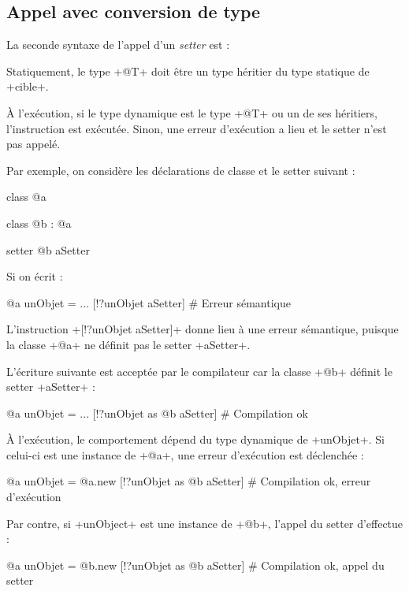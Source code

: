 \subsection{Appel avec conversion de type}

La seconde syntaxe de l'appel d'un  \emph{setter} est :

\begin{galgas}
\end{galgas}

Statiquement, le type \ggs+@T+ doit être un type héritier du type statique de \ggs+cible+.

À l'exécution, si le type dynamique est le type \ggs+@T+ ou un de ses héritiers, l'instruction est exécutée. Sinon, une erreur d'exécution a lieu et le setter n'est pas appelé.

Par exemple, on considère les déclarations de classe et le setter suivant :

\begin{galgas}
class @a { }

class @b : @a { }

setter @b aSetter { }
\end{galgas}

Si on écrit :
\begin{galgas}
@a unObjet = ...
[!?unObjet aSetter] # Erreur sémantique
\end{galgas}

L'instruction \ggs+[!?unObjet aSetter]+ donne lieu à une erreur sémantique, puisque la classe \ggs+@a+ ne définit pas le setter \ggs+aSetter+.

L'écriture suivante est acceptée par le compilateur car la classe \ggs+@b+ définit le setter \ggs+aSetter+ :
\begin{galgas}
@a unObjet = ...
[!?unObjet as @b aSetter] # Compilation ok
\end{galgas}

À l'exécution, le comportement dépend du type dynamique de \ggs+unObjet+. Si celui-ci est une instance de \ggs+@a+, une erreur d'exécution est déclenchée :
\begin{galgas}
@a unObjet = @a.new
[!?unObjet as @b aSetter] # Compilation ok, erreur d'exécution
\end{galgas}


Par contre, si \ggs+unObject+ est une instance de \ggs+@b+, l'appel du setter d'effectue :
\begin{galgas}
@a unObjet = @b.new
[!?unObjet as @b aSetter] # Compilation ok, appel du setter
\end{galgas}










